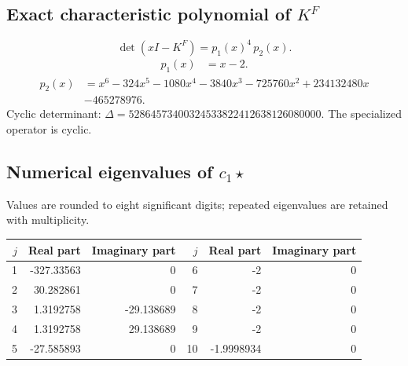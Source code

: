 \documentclass[10pt,a4paper]{article}
\begin{document}
\subsection*{Exact characteristic polynomial of $K^F$}
\[\det(xI-K^F)=p_{1}(x)^{4}\,p_{2}(x).\]
\[\begin{aligned}p_{1}(x)&=x - 2.\end{aligned}\]
\[\begin{aligned}p_{2}(x)&=x^{6} - 324 x^{5} - 1080 x^{4} - 3840 x^{3} - 725760 x^{2} + 234132480 x\\&-465278976.\end{aligned}\]
Cyclic determinant: $\Delta=52864573400324533822412638126080000$. The specialized operator is cyclic.
\subsection*{Numerical eigenvalues of $c_1\star$}
Values are rounded to eight significant digits; repeated eigenvalues are retained with multiplicity.
\begin{center}\small\begin{tabular}{rrr@{\qquad}rrr}\toprule $j$ & Real part & Imaginary part & $j$ & Real part & Imaginary part\\\midrule
1 & -327.33563 & 0 & 6 & -2 & 0\\
2 & 30.282861 & 0 & 7 & -2 & 0\\
3 & 1.3192758 & -29.138689 & 8 & -2 & 0\\
4 & 1.3192758 & 29.138689 & 9 & -2 & 0\\
5 & -27.585893 & 0 & 10 & -1.9998934 & 0\\
\bottomrule\end{tabular}\end{center}
\end{document}
